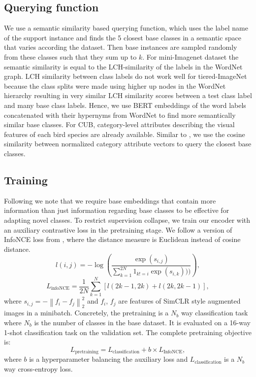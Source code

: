\documentclass{bmvc2k}
\begin{document}
\subsection{Querying function} \label{sec:queryingfunction}
We use a semantic similarity based querying function, which uses the label name of the support instance and finds the 5 closest base classes in a semantic space that varies according the dataset. Then base instances are sampled randomly from these classes such that they sum up to $k$. For mini-Imagenet dataset the semantic similarity is equal to the LCH-similarity\cite{leacock1998combining} of the labels in the WordNet graph\cite{miller1995wordnet}. LCH similarity between class labels do not work well for tiered-ImageNet because the class splits were made using higher up nodes in the WordNet hierarchy resulting in very similar LCH similarity scores between a test class label and many base class labels. Hence, we use BERT\cite{devlin-etal-2019-bert} embeddings of the word labels concatenated with their hypernyms from WordNet to find more semantically similar base classes. For CUB, category-level attributes describing the visual features of each bird species are already available. Similar to \cite{shi2019relational}, 
we use the cosine similarity between normalized category attribute vectors to query the closest base classes.




\subsection{Training} \label{sec:training}
Following \cite{doersch2020crosstransformers,mangla2020charting,liu2021learning} we note that we require base embeddings that contain more information than just information regarding base classes to be effective for adapting novel classes. To restrict supervision collapse, we train our encoder with an auxiliary contrastive loss in the pretraining stage. We follow a version of InfoNCE loss from \cite{chen2018a}, where the distance measure is Euclidean instead of cosine distance. 
\begin{equation}l(i,j) = -\log\left(\frac{\exp(s_{i,j})}{\sum_{k=1}^{2N}{1}_{k!=i}\exp(s_{i,k})))}\right),\end{equation}
\begin{equation}L_\text{infoNCE} = \frac{1}{2N}\sum_{k=1}^{N}\left [ l(2k-1,2k) + l(2k,2k-1) \right ],\end{equation}
where \(s_{i,j}=-\left \| f_{i}-f_{j} \right \|_{2}^{2}\) and \(f_{i}\), \(f_{j}\) are features of SimCLR \cite{chen2020simple} style augmented  images in a minibatch.
Concretely, the pretraining is a \(N_{b}\) way classification task where \(N_{b}\) is the number of classes in the base dataset. It is evaluated on a 16-way 1-shot classification task on the validation set. The complete pretraining objective is:
\begin{equation}L_\text{pretraining}=L_\text{classification} + b\times L_\text{InfoNCE},\end{equation}
where $b$ is a hyperparameter balancing the auxiliary loss and \(L_\text{classification}\) is a \(N_{b}\) way cross-entropy loss.
\end{document}
